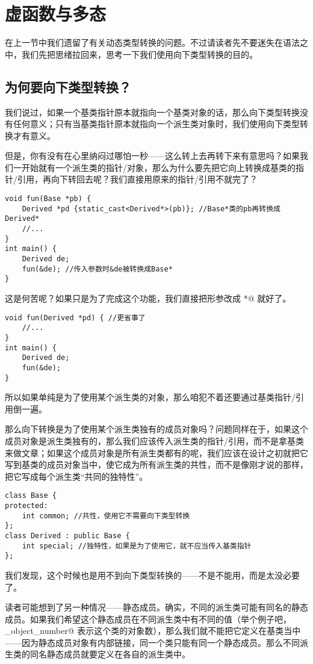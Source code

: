 \section{虚函数与多态}
在上一节中我们遗留了有关动态类型转换的问题。不过请读者先不要迷失在语法之中，我们先把思绪拉回来，思考一下我们使用向下类型转换的目的。\par
\subsection*{为何要向下类型转换？}
我们说过，如果一个基类指针原本就指向一个基类对象的话，那么向下类型转换没有任何意义；只有当基类指针原本就指向一个派生类对象时，我们使用向下类型转换才有意义。\par
但是，你有没有在心里纳闷过哪怕一秒——这么转上去再转下来有意思吗？如果我们一开始就有一个派生类的指针/对象，那么为什么要先把它向上转换成基类的指针/引用，再向下转回去呢？我们直接用原来的指针/引用不就完了？
\begin{lstlisting}
void fun(Base *pb) {
    Derived *pd {static_cast<Derived*>(pb)}; //Base*类的pb再转换成Derived*
    //...
}
int main() {
    Derived de;
    fun(&de); //传入参数时&de被转换成Base*
}
\end{lstlisting}
这是何苦呢？如果只是为了完成这个功能，我们直接把形参改成 \lstinline@Derived*@ 就好了。
\begin{lstlisting}
void fun(Derived *pd) { //更省事了
    //...
}
int main() {
    Derived de;
    fun(&de);
}
\end{lstlisting}
所以如果单纯是为了使用某个派生类的对象，那么咱犯不着还要通过基类指针/引用倒一遍。\par
那么向下转换是为了使用某个派生类独有的成员对象吗？问题同样在于，如果这个成员对象是派生类独有的，那么我们应该传入派生类的指针/引用，而不是拿基类来做文章；如果这个成员对象是所有派生类都有的呢，我们应该在设计之初就把它写到基类的成员对象当中，使它成为所有派生类的共性，而不是像刚才说的那样，把它写成每个派生类``共同的独特性''。
\begin{lstlisting}
class Base {
protected:
    int common; //共性，使用它不需要向下类型转换
};
class Derived : public Base {
    int special; //独特性，如果是为了使用它，就不应当传入基类指针
};
\end{lstlisting}
我们发现，这个时候也是用不到向下类型转换的——不是不能用，而是太没必要了。\par
读者可能想到了另一种情况——静态成员。确实，不同的派生类可能有同名的静态成员。如果我们希望这个静态成员在不同派生类中有不同的值（举个例子吧，\lstinline@_object_number@ 表示这个类的对象数），那么我们就不能把它定义在基类当中——因为静态成员对象有内部链接，同一个类只能有同一个静态成员。那么不同派生类的同名静态成员就要定义在各自的派生类中。
